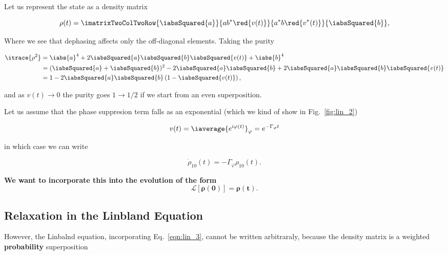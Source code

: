   \begin{framed}\noindent
    \noindent Let us represent the state as a density matrix

  \begin{equation}\label{key}
    \rho(t) = \imatrixTwoColTwoRow{\iabsSquared{a}}{ab^{*}\red{v(t)}}{a^{*}b\red{v^{*}(t)}}{\iabsSquared{b}},
  \end{equation}

  Where   we  see   that  dephasing   affects  only   the  off-diagonal
  elements. Taking the purity

  \begin{equation}\label{key}
    \begin{aligned}
      \itrace{\rho^2} & = \iabs{a}^4 + 2\iabsSquared{a}\iabsSquared{b}\iabsSquared{v(t)} + \iabs{b}^4\\
      & = (\iabsSquared{a}+\iabsSquared{b})^2 - 2\iabsSquared{a}\iabsSquared{b} + 2\iabsSquared{a}\iabsSquared{b}\iabsSquared{v(t)}\\
      &                    =                     1                    -
      2\iabsSquared{a}\iabsSquared{b}\left(1-\iabsSquared{v(t)}\right),
    \end{aligned}
  \end{equation}

  \noindent   and    as   $    v(t)   \rightarrow   0    $   the    purity   goes
  $ 1 \rightarrow 1/2 $ if we start from an even superposition.
\end{framed}

\noindent Let  us assume  that the  phase suppresion  term falls  as an
exponential (which we kind of show in Fig.~\ref{fig:lin_2})

  \begin{equation}\label{key}
    v(t) = \iaverage{e^{i\varphi(t)}}_\varphi = e^{-\Gamma_{\varphi}t}
  \end{equation}

  \noindent in which case we can write

  \begin{equation}\label{eqn:lin_3}
    \dot{\rho}_{10}(t) = -\Gamma_{\varphi}\rho_{10}(t).
  \end{equation}

  \noindent \textbf{We want  to incorporate this into  the evolution of
    the form}
  \begin{equation}\label{eq:linrelax_5}
    \mathbf{\mathcal{L}[\rho(0)] = \rho(t)}.
  \end{equation}
  \subsection{Relaxation in the Linbland Equation}
  However, the Linbalnd  equation, incorporating Eq.~\eqref{eqn:lin_3},
  cannot  be  written arbitraraly,  because  the  density matrix  is  a
  weighted \textbf{probability} superposition

